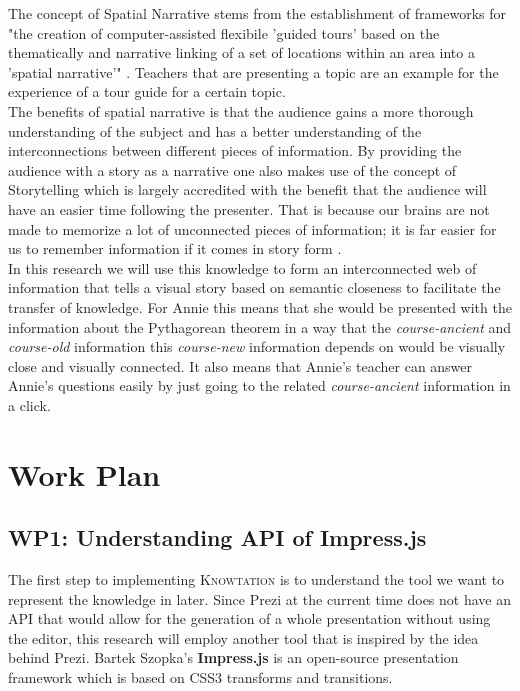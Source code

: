 \documentclass[twoside]{article}
\newcommand{\sys}{\textsc{Knowtation}\xspace}
\begin{document}
The concept of Spatial Narrative stems from the establishment of frameworks for "the creation of computer-assisted flexibile 'guided tours' based on the thematically and narrative linking of a set of locations within an area into a 'spatial narrative'" \cite{SpatialNarratives:npentrel14}. Teachers that are presenting a topic are an example for the experience of a tour guide for a certain topic.\\

The benefits of spatial narrative is that the audience gains a more thorough understanding of the subject and has a better understanding of the interconnections between different pieces of information. By providing the audience with a story as a narrative one also makes use of the concept of Storytelling which is largely accredited with the benefit that the audience will have an easier time following the presenter. That is because our brains are not made to memorize a lot of unconnected pieces of information; it is far easier for us to remember information if it comes in story form \cite{Storytelling:npentrel14}.\\

In this research we will use this knowledge to form an interconnected web of information that tells a visual story based on semantic closeness to facilitate the transfer of knowledge. For Annie this means that she would be presented with the information about the Pythagorean theorem in a way that the \textit{course-ancient} and \textit{course-old} information this \textit{course-new} information depends on would be visually close and visually connected. It also means that Annie's teacher can answer Annie's questions easily by just going to the related \textit{course-ancient} information in a click.\\

\section{Work Plan}
\label{sec:workplan}

\subsection{WP1: Understanding API of Impress.js}
\label{sec:wp1}

The first step to implementing \sys {} is to understand the tool we want to represent the knowledge in later. Since Prezi at the current time does not have an API that would allow for the generation of a whole presentation without using the editor, this research will employ another tool that is inspired by the idea behind Prezi. Bartek Szopka's \textbf{Impress.js} \cite{JSImpress:npentrel14} is an open-source presentation framework which is based on CSS3 transforms and transitions.\\
\end{document}
